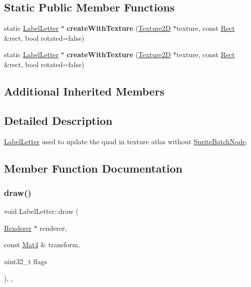\subsection*{Static Public Member Functions}
\begin{DoxyCompactItemize}
\item 
\mbox{\label{classLabelLetter_abf0960a5c519b2e279fb35cfcb4cac2a}} 
static \hyperlink{classLabelLetter}{Label\+Letter} $\ast$ {\bfseries create\+With\+Texture} (\hyperlink{classTexture2D}{Texture2D} $\ast$texture, const \hyperlink{classRect}{Rect} \&rect, bool rotated=false)
\item 
\mbox{\label{classLabelLetter_abf0960a5c519b2e279fb35cfcb4cac2a}} 
static \hyperlink{classLabelLetter}{Label\+Letter} $\ast$ {\bfseries create\+With\+Texture} (\hyperlink{classTexture2D}{Texture2D} $\ast$texture, const \hyperlink{classRect}{Rect} \&rect, bool rotated=false)
\end{DoxyCompactItemize}
\subsection*{Additional Inherited Members}


\subsection{Detailed Description}
\hyperlink{classLabelLetter}{Label\+Letter} used to update the quad in texture atlas without \hyperlink{classSpriteBatchNode}{Sprite\+Batch\+Node}. 

\subsection{Member Function Documentation}
\mbox{\label{classLabelLetter_a3e0850000ea292406f5d905a431b03dc}} 
\subsubsection{\texorpdfstring{draw()}{draw()}\hspace{0.1cm}{\footnotesize\ttfamily [1/2]}}
{\footnotesize\ttfamily void Label\+Letter\+::draw (\begin{DoxyParamCaption}\item[{\hyperlink{classRenderer}{Renderer} $\ast$}]{renderer,  }\item[{const \hyperlink{classMat4}{Mat4} \&}]{transform,  }\item[{uint32\+\_\+t}]{flags }\end{DoxyParamCaption})\hspace{0.3cm}{\ttfamily [inline]}, {\ttfamily [override]}, {\ttfamily [virtual]}}

